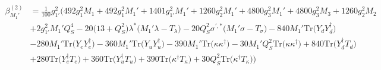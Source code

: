 {\begin{align}
\beta_{M_1'}^{(2)} & =  
\frac{1}{100} g_{1'}^{2} \Big(492 g_{1}^{2} M_1 +492 g_{1}^{2} M_1' +1401 g_{1'}^{2} M_1' +1260 g_{2}^{2} M_1' +4800 g_{3}^{2} M_1' +4800 g_{3}^{2} M_3 +1260 g_{2}^{2} M_2 \nonumber \\ 
 &+2 g_{1'}^{2} M_1' Q_{S}^{4} -20 \Big(13 + Q_{S}^{2}\Big)\lambda^* \Big(M_1' \lambda  - T_{\lambda} \Big)-20 Q_{S}^{2} \sigma^{\prime,*} \Big(M_1' \sigma  - T_{\sigma} \Big)-840 M_1' \mbox{Tr}\Big({Y_d  Y_{d}^{\dagger}}\Big) \nonumber \\ 
 &-280 M_1' \mbox{Tr}\Big({Y_e  Y_{e}^{\dagger}}\Big) -360 M_1' \mbox{Tr}\Big({Y_u  Y_{u}^{\dagger}}\Big) -390 M_1' \mbox{Tr}\Big({\kappa  \kappa^{\dagger}}\Big) -30 M_1' Q_{S}^{2} \mbox{Tr}\Big({\kappa  \kappa^{\dagger}}\Big) +840 \mbox{Tr}\Big({Y_{d}^{\dagger}  T_d}\Big) \nonumber \\ 
 &+280 \mbox{Tr}\Big({Y_{e}^{\dagger}  T_e}\Big) +360 \mbox{Tr}\Big({Y_{u}^{\dagger}  T_u}\Big) +390 \mbox{Tr}\Big({\kappa^{\dagger}  T_{\kappa}}\Big) +30 Q_{S}^{2} \mbox{Tr}\Big({\kappa^{\dagger}  T_{\kappa}}\Big) \Big)
\end{align}} 
